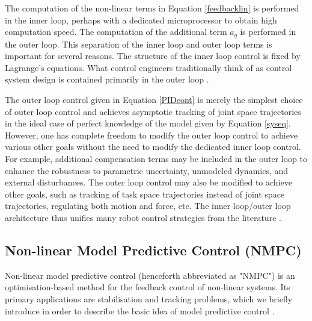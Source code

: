 \documentclass{UoNMCHA}
\numberwithin{equation}{section}
\begin{document}
	The computation of the non-linear terms in Equation \ref{feedbacklin} is performed in the inner loop, perhaps with a dedicated microprocessor to obtain high computation speed. The computation of the additional term $a_q$ is performed in the outer loop. This separation of the inner loop and outer loop terms is important for several reasons. The structure of the inner loop control is fixed by Lagrange's equations. What control engineers traditionally think of as control system design is contained primarily in the outer loop \cite{levine_1996_the}. 
	
	\newpage
	
	The outer loop control given in Equation \ref{PIDcont} is merely the simplest choice of outer loop control and achieves asymptotic tracking of joint space trajectories in the ideal case of perfect knowledge of the model given by Equation \ref{syseq}. However, one has complete freedom to modify the outer loop control to achieve various other goals without the need to modify the dedicated inner loop control. For example, additional compensation terms may be included in the outer loop to enhance the robustness to parametric uncertainty, unmodeled dynamics, and external disturbances. The outer loop control may also be modified to achieve other goals, such as tracking of task space trajectories instead of joint space trajectories, regulating both motion and force, etc. The inner loop/outer loop architecture thus unifies many robot control strategies from the literature \cite{levine_1996_the}.
	
	
	\subsection{Non-linear Model Predictive Control (NMPC)}
	
	Non-linear model predictive control (henceforth abbreviated as "NMPC")  is an optimisation-based method for the feedback control of non-linear systems. Its primary applications are stabilisation and tracking problems, which we briefly introduce in order to describe the basic idea of model predictive control \cite{larsgrune_2017_nonlinear}. \\
	
\end{document}
